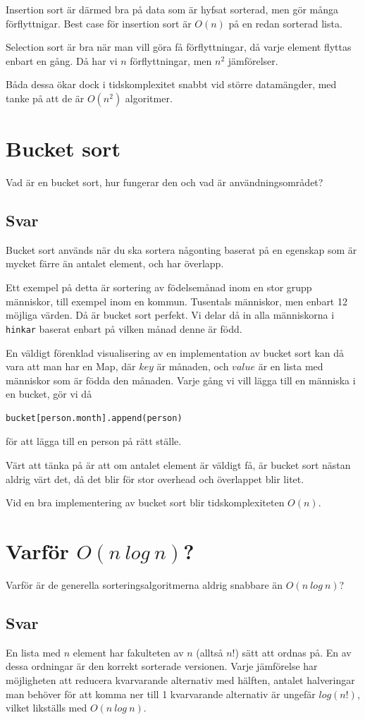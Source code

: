 \documentclass[a5paper,10pt,oneside]{article}
\begin{document}
Insertion sort är därmed bra på data som är hyfsat sorterad, men gör många förflyttnigar. 
Best case för insertion sort är $O(n)$ på en redan sorterad lista. 

Selection sort är bra när man vill göra få förflyttningar, då varje element flyttas enbart en gång.
Då har vi $n$ förflyttningar, men $n^2$ jämförelser.


Båda dessa ökar dock i tidskomplexitet snabbt vid större datamängder, med tanke på att de är
$O(n^2)$ algoritmer.

\section{Bucket sort}
Vad är en bucket sort, hur fungerar den och vad är användningsområdet?
\subsection{Svar}
Bucket sort används när du ska sortera någonting baserat på en egenskap som är mycket färre än antalet element,
och har överlapp.

Ett exempel på detta är sortering av födelsemånad inom en stor grupp människor, till exempel inom en kommun.
Tusentals människor, men enbart 12 möjliga värden. Då är bucket sort perfekt.
Vi delar då in alla människorna i \texttt{hinkar} baserat enbart på vilken månad denne är född.

En väldigt förenklad visualisering av en implementation av bucket sort kan då vara att man har en Map,
där $key$ är månaden, och $value$ är en lista med människor som är födda den månaden.
Varje gång vi vill lägga till en människa i en bucket, gör vi då 
\begin{lstlisting}
bucket[person.month].append(person)
\end{lstlisting}
för att lägga till en person på rätt ställe.

Värt att tänka på är att om antalet element är väldigt få, är bucket sort nästan aldrig värt det,
då det blir för stor overhead och överlappet blir litet.

Vid en bra implementering av bucket sort blir tidskomplexiteten $O(n)$.


\section{Varför $O(n\ log\ n)$?}
Varför är de generella sorteringsalgoritmerna aldrig snabbare än $O(n\ log\ n)$?
\subsection{Svar}
En lista med $n$ element har fakulteten av $n$ (alltså $n!$) sätt att ordnas på. En av dessa ordningar är den korrekt sorterade versionen. 
Varje jämförelse har möjligheten att reducera kvarvarande alternativ med hälften, antalet halveringar man behöver för att komma ner till 1 kvarvarande alternativ
är ungefär $log(n!)$, vilket likställs med $O(n\ log\ n)$.


\end{document}
